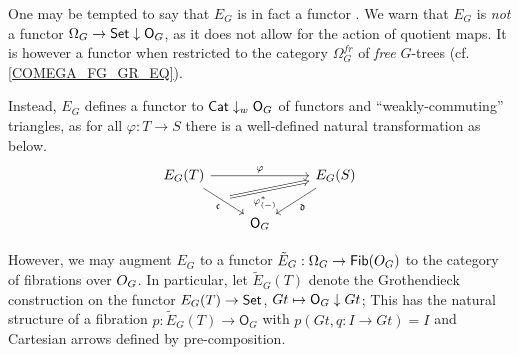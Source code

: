 \documentclass[a4paper,10pt
,draft
]{article}%
\renewcommand{\phi}{\varphi}
\renewcommand{\1}{\ensuremath{\mathbb{id}}}
\begin{document}
\begin{remark}
      \label{EG_OVER_OG_REM}
      One may be tempted to say that $E_G$ is in fact a functor .
      We warn that $E_G$ is \textit{not} a functor
      $\Omega_G \to \mathsf{Set} \downarrow \mathsf O_G$,
      as it does not allow for the action of quotient maps.
      It is however a functor when restricted to the category $\Omega_G^{fr}$ of \textit{free} $G$-trees
      (cf. \eqref{COMEGA_FG_GR_EQ}).
      
      Instead, $E_G$ defines a functor to $\mathsf{Cat} \downarrow_w \mathsf O_G$ of functors and ``weakly-commuting'' triangles,
      as for all $\phi: T \to S$ there is a well-defined natural transformation as below.
      \begin{equation}
            \begin{tikzcd}
                  E_G(T) \arrow[rr, "\phi"] \arrow[dr, "\mathfrak c"', ""{name = U}]
                  &&
                  |[alias = V]| E_G(S) \arrow[dl, "\mathfrak d"]
                  \\
                  &
                  \mathsf O_G
                  \arrow[Rightarrow, from = U, to = V, "\phi_{(-)}^{\**}"'{near start}]
            \end{tikzcd}
      \end{equation}
      
      However, we may augment $E_G$ to a functor
      $\tilde E_G: \Omega_G \to \mathsf{Fib}(\mathsf \mathsf O_G)$
      to the category of fibrations over $\mathsf \mathsf O_G$.
      In particular, let $\tilde E_G(T)$ denote the Grothendieck construction on the functor
      $E_G(T) \to \mathsf{Set}$, $G t \mapsto \mathsf \mathsf \mathsf O_G \downarrow G t$;
      This has the natural structure of a fibration $p: \tilde E_G(T) \to \mathsf O_G$
      with $p(G t, q: I \to G t) = I$ and Cartesian arrows defined by pre-composition.
\end{remark}
\end{document}
